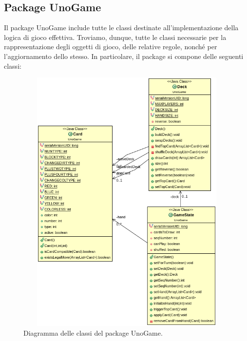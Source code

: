 \documentclass[11pt]{article} %
\begin{document}
\subsection{Package UnoGame}
Il package UnoGame include tutte le classi destinate all'implementazione della logica di gioco effettiva. Troviamo, dunque, tutte le classi necessarie per la rappresentazione degli oggetti di gioco, delle relative regole, nonché per l'aggiornamento dello stesso. In particolare, il package si compone delle seguenti classi:
\begin{figure}[h]
\centering%
\includegraphics[height=13.5cm, width=14cm, keepaspectratio]{UnoGame.png}%
\caption{Diagramma delle classi del package UnoGame.}
\end{figure}
\end{document}
